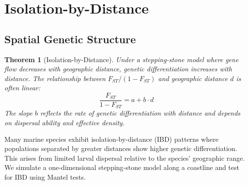 \documentclass[11pt,a4paper]{article}
\newtheorem{theorem}{Theorem}[section]
\begin{document}
\section{Isolation-by-Distance}

\subsection{Spatial Genetic Structure}

\begin{theorem}[Isolation-by-Distance]
Under a stepping-stone model where gene flow decreases with geographic distance, genetic
differentiation increases with distance. The relationship between $F_{ST}/(1-F_{ST})$ and
geographic distance $d$ is often linear:
\begin{equation}
\frac{F_{ST}}{1 - F_{ST}} = a + b \cdot d
\end{equation}
The slope $b$ reflects the rate of genetic differentiation with distance and depends on
dispersal ability and effective density.
\end{theorem}

Many marine species exhibit isolation-by-distance (IBD) patterns where populations separated by
greater distances show higher genetic differentiation. This arises from limited larval dispersal
relative to the species' geographic range. We simulate a one-dimensional stepping-stone model
along a coastline and test for IBD using Mantel tests.
\end{document}
